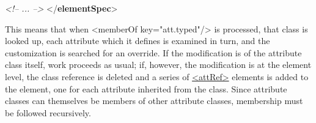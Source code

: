 \begin{shaded}
\mbox{}\newline 
\textit{<!-- ... -->}\mbox{}\newline 
{}\mbox{}\newline 
\hspace*{1em}\mbox{}\newline 
{}\mbox{}\newline 
{</\textbf{elementSpec}>}\end{shaded}\egroup\par \noindent  This means that when <memberOf key="att.typed"/> is processed, that class is looked up, each attribute which it defines is examined in turn, and the customization is searched for an override. If the modification is of the attribute class itself, work proceeds as usual; if, however, the modification is at the element level, the class reference is deleted and a series of \hyperref[TEI.attRef]{<attRef>} elements is added to the element, one for each attribute inherited from the class. Since attribute classes can themselves be members of other attribute classes, membership must be followed recursively.\par
